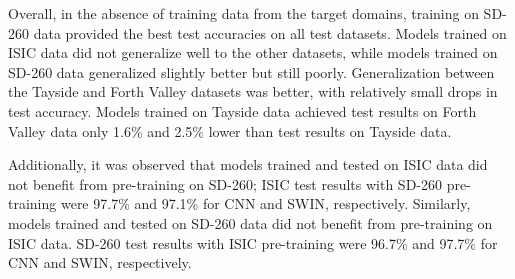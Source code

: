 \begin{table}[h]
	\centering
	\caption{Class-balanced accuracy when training and testing on the various datasets.}
	\label{tab:generalisation_results}
\end{table}

Overall, in the absence of training data from the target domains, training on SD-260 data provided the best test accuracies on all test datasets. Models trained on ISIC data did not generalize well to the other datasets, while models trained on SD-260 data generalized slightly better but still poorly. Generalization between the Tayside and Forth Valley datasets was better, with relatively small drops in test accuracy. Models trained on Tayside data achieved test results on Forth Valley data only 1.6\% and 2.5\% lower than test results on Tayside data.

Additionally, it was observed that models trained and tested on ISIC data did not benefit from pre-training on SD-260; ISIC test results with SD-260 pre-training were 97.7\% and 97.1\% for CNN and SWIN, respectively. Similarly, models trained and tested on SD-260 data did not benefit from pre-training on ISIC data. SD-260 test results with ISIC pre-training were 96.7\% and 97.7\% for CNN and SWIN, respectively.

